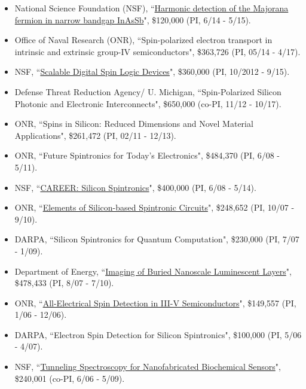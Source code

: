 \documentclass[paper=letter,fontsize=11pt]{scrartcl} %
\newcommand{\FundingEntry}[5]{
        \noindent #1, ``#2", \$#3 (#4, #5).}
\begin{document}
\begin{itemize}

\item\FundingEntry {National Science Foundation (NSF)}{\href{http://www.nsf.gov/awardsearch/showAward?AWD_ID=1408796}{Harmonic detection of the Majorana fermion in narrow bandgap InAsSb}}{120,000}{PI}{6/14 - 5/15}
\item\FundingEntry {Office of Naval Research (ONR)}{Spin-polarized electron transport in intrinsic and extrinsic group-IV semiconductors}{363,726}{PI}{05/14 - 4/17}
\item\FundingEntry {NSF}{\href{http://www.nsf.gov/awardsearch/showAward?AWD_ID=1231855}{Scalable Digital Spin Logic Devices}}{360,000}{PI}{10/2012 - 9/15}
\item\FundingEntry {Defense Threat Reduction Agency/ U. Michigan}{Spin-Polarized Silicon Photonic and Electronic Interconnects}{650,000}{co-PI}{11/12 - 10/17}
\item\FundingEntry {ONR}{Spins in Silicon: Reduced Dimensions and Novel Material Applications}{261,472}{PI}{02/11 - 12/13}
\item\FundingEntry {ONR}{Future Spintronics for Today's Electronics}{484,370}{PI}{6/08 - 5/11}
\item\FundingEntry {NSF}{\href{http://www.nsf.gov/awardsearch/showAward?AWD_ID=0901941}{CAREER: Silicon Spintronics}}{400,000}{PI}{6/08 - 5/14}
\item\FundingEntry {ONR}{\href{http://www.dtic.mil/dtic/tr/fulltext/u2/a533911.pdf}{Elements of Silicon-based Spintronic Circuits}}{248,652}{PI}{10/07 - 9/10}
\item\FundingEntry {DARPA}{Silicon Spintronics for Quantum Computation}{230,000}{PI}{7/07 - 1/09} 
\item\FundingEntry {Department of Energy}{\href{http://www.osti.gov/scitech/biblio/1067346}{Imaging of Buried Nanoscale Luminescent Layers}}{478,433 }{PI}{8/07 - 7/10}
\item\FundingEntry {ONR}{\href{http://www.dtic.mil/dtic/tr/fulltext/u2/a462737.pdf}{All-Electrical Spin Detection in III-V Semiconductors}}{149,557}{PI}{1/06  - 12/06}
\item\FundingEntry {DARPA}{Electron Spin Detection for Silicon Spintronics}{100,000}{PI}{5/06 - 4/07}
\item\FundingEntry {NSF}{\href{http://www.nsf.gov/awardsearch/showAward?AWD_ID=0601269}{Tunneling Spectroscopy for Nanofabricated Biochemical Sensors}}{240,001}{co-PI}{6/06 - 5/09}

\end{itemize}
\end{document}

